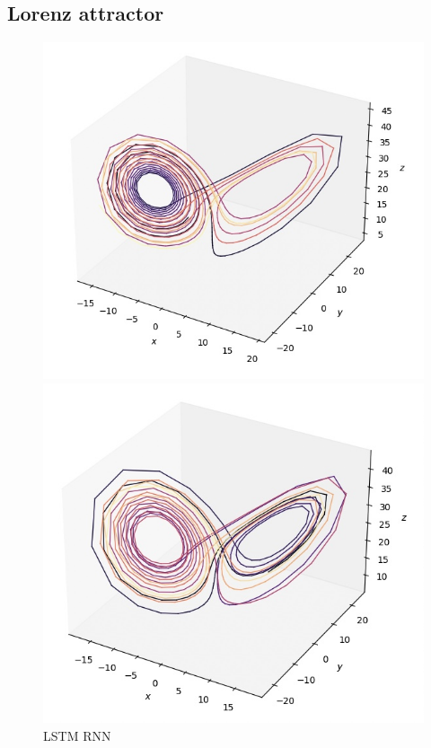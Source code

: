 \documentclass[11pt]{article}
\begin{document}
\subsection{Lorenz attractor}
\begin{figure}[ht]
    \centering
    \begin{minipage}{0.32\textwidth}
        \centering
        \includegraphics[width=\textwidth]{rnn_lorenz.jpeg}
        \caption{LSTM RNN}
        \label{fig:rnn_lorenz}
    \end{minipage}
    \hfill
    \begin{minipage}{0.32\textwidth}
        \centering
        \includegraphics[width=\textwidth]{echo_lorenz.jpeg}

\end{minipage}
\end{figure}
\end{document}
